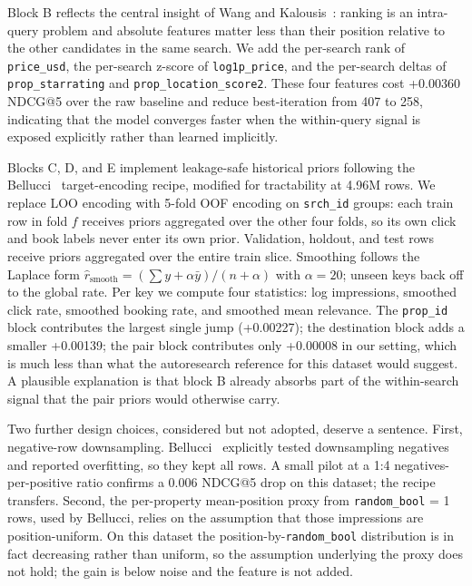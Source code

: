 \documentclass[runningheads]{llncs}
\begin{document}
Block B reflects the central insight of Wang and Kalousis~\cite{wang2014expedia}: ranking is an intra-query problem and absolute features matter less than their position relative to the other candidates in the same search. We add the per-search rank of \texttt{price\_usd}, the per-search z-score of \texttt{log1p\_price}, and the per-search deltas of \texttt{prop\_starrating} and \texttt{prop\_location\_score2}. These four features cost +0.00360 NDCG@5 over the raw baseline and reduce best-iteration from 407 to 258, indicating that the model converges faster when the within-query signal is exposed explicitly rather than learned implicitly.

Blocks C, D, and E implement leakage-safe historical priors following the Bellucci~\cite{bellucci2021dmt} target-encoding recipe, modified for tractability at 4.96M rows. We replace LOO encoding with 5-fold OOF encoding on \texttt{srch\_id} groups: each train row in fold $f$ receives priors aggregated over the other four folds, so its own click and book labels never enter its own prior. Validation, holdout, and test rows receive priors aggregated over the entire train slice. Smoothing follows the Laplace form $\widehat{r}_{\text{smooth}} = (\sum y + \alpha \bar y) / (n + \alpha)$ with $\alpha = 20$; unseen keys back off to the global rate. Per key we compute four statistics: log impressions, smoothed click rate, smoothed booking rate, and smoothed mean relevance. The \texttt{prop\_id} block contributes the largest single jump (+0.00227); the destination block adds a smaller +0.00139; the pair block contributes only +0.00008 in our setting, which is much less than what the autoresearch reference for this dataset would suggest. A plausible explanation is that block B already absorbs part of the within-search signal that the pair priors would otherwise carry.

Two further design choices, considered but not adopted, deserve a sentence. First, negative-row downsampling. Bellucci~\cite{bellucci2021dmt} explicitly tested downsampling negatives and reported overfitting, so they kept all rows. A small pilot at a 1:4 negatives-per-positive ratio confirms a 0.006 NDCG@5 drop on this dataset; the recipe transfers. Second, the per-property mean-position proxy from \texttt{random\_bool} = 1 rows, used by Bellucci, relies on the assumption that those impressions are position-uniform. On this dataset the position-by-\texttt{random\_bool} distribution is in fact decreasing rather than uniform, so the assumption underlying the proxy does not hold; the gain is below noise and the feature is not added.
\end{document}

